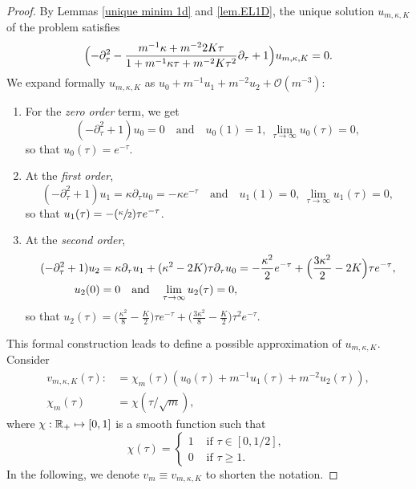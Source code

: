 \documentclass[JEP,XML,SOM,Unicode]{cedram}
\newcommand\mto{\mathchoice{\longmapsto}{\mapsto}{\mapsto}{\mapsto}}
\newcommand{\Psfrac}[2]{(\sfrac{#1}{#2})}
\newcommand{\scrO}{\mathscr{O}}
\theoremstyle{plain}
\theoremstyle{definition}
\newcommand{\RR}{\mathbb{R}}
\let\pa\partial
\begin{document}
\begin{proof}
By Lemmas \ref{unique minim 1d} and \ref{lem.EL1D}, the unique solution $u_{m,\kappa,K}$ of the problem satisfies
\[
\Bigl(
-\pa_\tau^2
-\frac{m^{-1}\kappa + m^{-2}2K\tau}{1 + m^{-1}\kappa \tau + m^{-2}K\tau^2}\pa_\tau
+1
\Bigr)u_{m,\kappa,K} = 0.
\]
We expand formally $u_{m,\kappa,K}$ as $u_0 + m^{-1}u_1 + m^{-2}u_2 + \scrO(m^{-3})$:
\begin{enumerate}
\item For the \emph{zero order} term, we get
\[
(-\pa_\tau^2 +1)u_0 = 0 \quad\text{and}\quad  u_0(1) = 1,\ \lim_{\tau\to \infty} u_0(\tau) = 0,
\]
so that $u_0(\tau)= e^{-\tau}$.
\item At the \emph{first order},
\[
(-\pa_\tau^2 +1)u_1 = \kappa\pa_\tau u_0 = -\kappa e^{-\tau} \quad\text{and}\quad  u_1(1) = 0,\ \lim_{\tau\to \infty} u_1(\tau) = 0,
\]
so that $u_1(\tau)= -\Psfrac{\kappa}{2}\tau e^{-\tau}$.
\item At the \emph{second order},
\[\begin{split}
(-\pa_\tau^2 +1)u_2 &= \kappa\pa_\tau u_1 + (\kappa^2-2K)\tau \pa_\tau u_0 = -\frac{\kappa^2}{2}e^{-\tau} + \Bigl(\frac{3\kappa^2}{2}-2K\Bigr)\tau e^{-\tau},
\\
u_2(0) &= 0 \quad\text{and}\quad \lim_{\tau\to \infty} u_2(\tau) = 0,
\end{split}\]
so that
$u_2(\tau)=
\bigl(
\frac{\kappa^2}{8}-\frac{K}{2}
\bigr)\tau e^{-\tau}
+
\bigl(
\frac{3\kappa^2}{8}-\frac{K}{2}
\bigr)\tau^2e^{-\tau}.
$
\end{enumerate}
This formal construction leads to define a possible approximation of $u_{m,\kappa,K}$.
Consider
\begin{equation}\label{eq:formaltestfun1}\begin{split}
v_{m,\kappa,K}(\tau) :&= \chi_m(\tau)\left(u_0(\tau) + m^{-1}u_1(\tau) + m^{-2}u_2(\tau)\right),\\
\chi_m(\tau) &= \chi(\tau/\sqrt{m}),
\end{split}\end{equation}
where $\chi : \RR_+\mto [0,1]$ is a smooth function such that
\[
\chi(\tau) = \begin{cases}
1 &\mbox{ if }\tau\in[0,1/2],\\
0 &\mbox{ if }\tau\geq 1.
\end{cases}\
\]
In the following, we denote $v_m \equiv v_{m,\kappa,K}$ to shorten the notation.


\end{proof}
\end{document}
